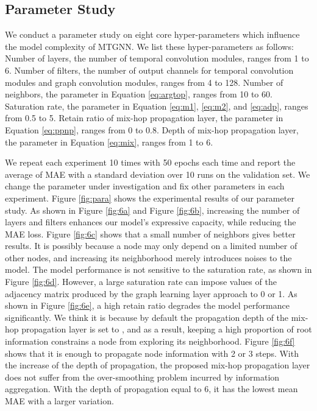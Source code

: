 \documentclass[sigconf]{acmart}
\begin{document}
\subsection{Parameter Study}
We conduct a parameter study on eight core hyper-parameters which influence the model complexity of MTGNN. We list these hyper-parameters as follows: Number of layers, the number of temporal convolution modules, ranges from 1 to 6. Number of filters, the number of output channels for temporal convolution modules and graph convolution modules, ranges from 4 to 128. Number of neighbors, the parameter  in Equation \ref{eq:argtop}, ranges from 10 to 60. Saturation rate, the parameter  in Equation \ref{eq:m1}, \ref{eq:m2}, and \ref{eq:adp}, ranges from 0.5 to 5. Retain ratio of mix-hop propagation layer, the parameter  in Equation \ref{eq:ppnp}, ranges from 0 to 0.8. Depth of mix-hop propagation layer, the parameter  in Equation \ref{eq:mix}, ranges from 1 to 6. 

We repeat each experiment 10 times with 50 epochs each time and report the average of MAE with a standard deviation over 10 runs on the validation set. We change the parameter under investigation and fix other parameters in each experiment.  Figure \ref{fig:para} shows the experimental results of our parameter study. As shown in Figure \ref{fig:6a} and Figure \ref{fig:6b}, increasing the number of layers and filters enhances our model's expressive capacity, while reducing the MAE loss. Figure \ref{fig:6c} shows that a small number of neighbors gives better results. It is possibly because a node may only depend on a limited number of other nodes, and increasing its neighborhood merely introduces noises to the model. The model performance is not sensitive to the saturation rate, as shown in Figure \ref{fig:6d}. However, a large saturation rate can impose values of the adjacency matrix produced by the graph learning layer approach to 0 or 1. As shown in Figure \ref{fig:6e}, a high retain ratio degrades the model performance significantly. We think it is because by default the propagation depth of the mix-hop propagation layer is set to , and as a result, keeping a high proportion of root information constrains a node from exploring its neighborhood. Figure \ref{fig:6f} shows that it is enough to propagate node information with 2 or 3 steps. With the increase of the depth of propagation, the proposed mix-hop propagation layer does not suffer from the over-smoothing problem incurred by information aggregation. With the depth of propagation equal to 6, it has the lowest mean MAE with a larger variation.
\end{document}
